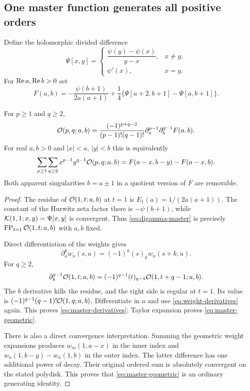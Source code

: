 \subsection{One master function generates all positive orders}

Define the holomorphic divided difference
\[
 \Psi[x,y]=\begin{cases}
 \dfrac{\psi(y)-\psi(x)}{y-x},&x\ne y,\\[5pt]
 \psi'(x),&x=y.
 \end{cases}
\]
For $\operatorname{Re} a,\operatorname{Re} b>0$ set
\begin{equation}\label{eq:digamma-master}
 F(a,b)=-\frac{\psi(b+1)}{2a(a+1)}
 +\frac14\{\Psi[a+2,b+1]-\Psi[a,b+1]\}.
\end{equation}

\begin{theorem}\label{thm:digamma-master}
For $p\ge1$ and $q\ge2$,
\begin{equation}\label{eq:master-derivatives}
 \mathcal O(p,q;a,b)=
 \frac{(-1)^{p+q-2}}{(p-1)!(q-1)!}
 \partial_a^{p-1}\partial_b^{q-1}F(a,b).
\end{equation}
For real $a,b>0$ and $|x|<a$, $|y|<b$ this is equivalently
\begin{equation}\label{eq:master-geometric}
 \sum_{p\ge1}\sum_{q\ge2}x^{p-1}y^{q-1}\mathcal O(p,q;a,b)
 =F(a-x,b-y)-F(a-x,b).
\end{equation}
Both apparent singularities $b=a\pm1$ in a quotient version of $F$
are removable.
\end{theorem}

\begin{proof}
The residue of $\mathcal O(1,t;a,b)$ at $t=1$ is
$E_1(a)=1/(2a(a+1))$. The constant of the Hurwitz zeta factor there is
$-\psi(b+1)$, while $\mathcal K(1,1;x,y)=\Psi[x,y]$ is convergent.
Thus \eqref{eq:digamma-master} is precisely
$\operatorname{FP}_{t=1}\mathcal O(1,t;a,b)$ with $a,b$ fixed.

Direct differentiation of the weights gives
\begin{equation}\label{eq:weight-derivatives}
 \partial_a^k w_n(s,a)=(-1)^k(s)_k w_n(s+k,a).
\end{equation}
For $q\ge2$,
\[
 \partial_b^{q-1}\mathcal O(1,t;a,b)
 =(-1)^{q-1}(t)_{q-1}\mathcal O(1,t+q-1;a,b).
\]
The $b$ derivative kills the residue, and the right side is regular at
$t=1$. Its value is $(-1)^{q-1}(q-1)!\mathcal O(1,q;a,b)$.
Differentiate in $a$ and use \eqref{eq:weight-derivatives} again.
This proves \eqref{eq:master-derivatives}; Taylor expansion proves
\eqref{eq:master-geometric}.

There is also a direct convergence interpretation. Summing the
geometric weight expansions produces $w_m(1,a-x)$ in the inner
index and $w_n(1,b-y)-w_n(1,b)$ in the outer index. The latter
difference has one additional power of decay. Their original ordered
sum is absolutely convergent on the stated polydisk. This proves that
\eqref{eq:master-geometric} is an ordinary generating identity.
\end{proof}


